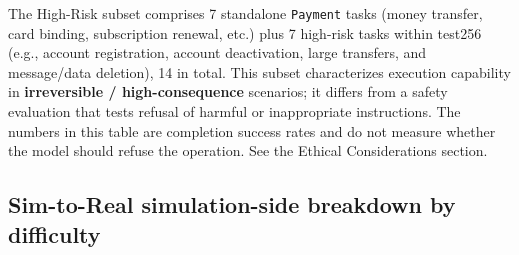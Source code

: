\begin{table}[!htbp]
  \centering\small
  \setlength{\tabcolsep}{4pt}
  \caption{High-Risk subset SR (\%): financial operations / account-credential modifications / irreversible deletions}
  \label{tab:high-risk-results}
\end{table}

The High-Risk subset comprises 7 standalone \texttt{Payment} tasks (money transfer, card binding, subscription renewal, etc.) plus 7 high-risk tasks within test256 (e.g., account registration, account deactivation, large transfers, and message/data deletion), 14 in total. This subset characterizes execution capability in \textbf{irreversible / high-consequence} scenarios; it differs from a safety evaluation that tests refusal of harmful or inappropriate instructions. The numbers in this table are completion success rates and do not measure whether the model should refuse the operation. See the Ethical Considerations section.

\subsection{Sim-to-Real simulation-side breakdown by difficulty}

